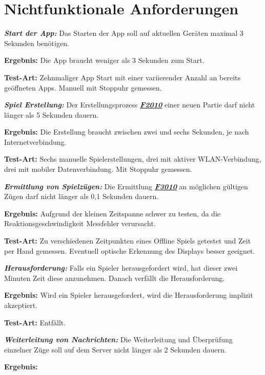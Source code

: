 \documentclass[parskip=full]{scrartcl}
\begin{document}
	\section{Nichtfunktionale Anforderungen}
\begin{description}
	
	\item[NF1010] \textbf{\textit{Start der App: }} Das Starten der App soll auf aktuellen Geräten maximal 3 Sekunden benötigen. 
	\item \textbf{Ergebnis: } Die App braucht weniger als 3 Sekunden zum Start.
	\item \textbf{Test-Art: } Zehnmaliger App Start mit einer variierender Anzahl an bereits geöffneten Apps. Manuell mit Stoppuhr gemessen.
	\item[NF1020] \textbf{\textit{Spiel Erstellung: }} Der Erstellungsprozess \hyperlink{F2010}{\textbf{\textit{F2010}}} einer neuen Partie darf nicht länger als 5 Sekunden dauern.
	\item \textbf{Ergebnis: } Die Erstellung braucht zwischen zwei und sechs Sekunden, je nach Internetverbindung.
	\item \textbf{Test-Art: } Sechs manuelle Spielerstellungen, drei mit aktiver WLAN-Verbindung, drei mit mobiler Datenverbindung. Mit Stoppuhr gemessen.
	\item[NF1030] \textbf{\textit{Ermittlung von Spielzügen: }} Die Ermittlung \hyperlink{F3010}{\textbf{\textit{F3010}}} an möglichen gültigen Zügen darf nicht länger als 0,1 Sekunden dauern.
	\item \textbf{Ergebnis: } Aufgrund der kleinen Zeitspanne schwer zu testen, da die Reaktionsgeschwindigkeit Messfehler verursacht.
	\item \textbf{Test-Art: } Zu verschiedenen Zeitpunkten eines Offline Spiels getestet und Zeit per Hand gemessen. Eventuell optische Erkennung des Displays besser geeignet.
	\item[NF1040] \textbf{\textit{Herausforderung: }} Falls ein Spieler herausgefordert wird, hat dieser zwei Minuten Zeit diese anzunehmen. Danach verfällt die Herausforderung. 
	\item \textbf{Ergebnis: } Wird ein Spieler herausgefordert, wird die Herausforderung implizit akzeptiert.
	\item \textbf{Test-Art: } Entfällt.
	\item[NF1050] \textbf{\textit{Weiterleitung von Nachrichten: }} Die Weiterleitung und Überprüfung einzelner Züge soll auf dem Server nicht länger als 2 Sekunden dauern.
	\item \textbf{Ergebnis: }

\end{description}
\end{document}
